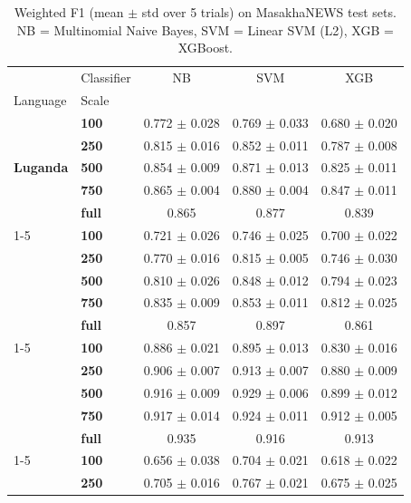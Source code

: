 \begin{table}[t]
\caption{Weighted F1 (mean $\pm$ std over 5 trials) on MasakhaNEWS test sets. NB = Multinomial Naive Bayes, SVM = Linear SVM (L2), XGB = XGBoost.}
\label{tab:main_results}
\begin{tabular}{llccc}
\toprule
 & Classifier & NB & SVM & XGB \\
Language & Scale &  &  &  \\
\midrule
\multirow[t]{5}{*}{\textbf{Luganda}} & \textbf{100} & 0.772 $\pm$ 0.028 & 0.769 $\pm$ 0.033 & 0.680 $\pm$ 0.020 \\
\textbf{} & \textbf{250} & 0.815 $\pm$ 0.016 & 0.852 $\pm$ 0.011 & 0.787 $\pm$ 0.008 \\
\textbf{} & \textbf{500} & 0.854 $\pm$ 0.009 & 0.871 $\pm$ 0.013 & 0.825 $\pm$ 0.011 \\
\textbf{} & \textbf{750} & 0.865 $\pm$ 0.004 & 0.880 $\pm$ 0.004 & 0.847 $\pm$ 0.011 \\
\textbf{} & \textbf{full} & 0.865 & 0.877 & 0.839 \\
\cline{1-5}
\multirow[t]{5}{*}{\textbf{Rundi}} & \textbf{100} & 0.721 $\pm$ 0.026 & 0.746 $\pm$ 0.025 & 0.700 $\pm$ 0.022 \\
\textbf{} & \textbf{250} & 0.770 $\pm$ 0.016 & 0.815 $\pm$ 0.005 & 0.746 $\pm$ 0.030 \\
\textbf{} & \textbf{500} & 0.810 $\pm$ 0.026 & 0.848 $\pm$ 0.012 & 0.794 $\pm$ 0.023 \\
\textbf{} & \textbf{750} & 0.835 $\pm$ 0.009 & 0.853 $\pm$ 0.011 & 0.812 $\pm$ 0.025 \\
\textbf{} & \textbf{full} & 0.857 & 0.897 & 0.861 \\
\cline{1-5}
\multirow[t]{5}{*}{\textbf{chiShona}} & \textbf{100} & 0.886 $\pm$ 0.021 & 0.895 $\pm$ 0.013 & 0.830 $\pm$ 0.016 \\
\textbf{} & \textbf{250} & 0.906 $\pm$ 0.007 & 0.913 $\pm$ 0.007 & 0.880 $\pm$ 0.009 \\
\textbf{} & \textbf{500} & 0.916 $\pm$ 0.009 & 0.929 $\pm$ 0.006 & 0.899 $\pm$ 0.012 \\
\textbf{} & \textbf{750} & 0.917 $\pm$ 0.014 & 0.924 $\pm$ 0.011 & 0.912 $\pm$ 0.005 \\
\textbf{} & \textbf{full} & 0.935 & 0.916 & 0.913 \\
\cline{1-5}
\multirow[t]{5}{*}{\textbf{Kiswahili}} & \textbf{100} & 0.656 $\pm$ 0.038 & 0.704 $\pm$ 0.021 & 0.618 $\pm$ 0.022 \\
\textbf{} & \textbf{250} & 0.705 $\pm$ 0.016 & 0.767 $\pm$ 0.021 & 0.675 $\pm$ 0.025 \\

\end{tabular}
\end{table}
